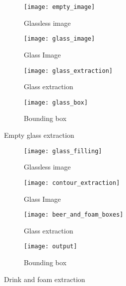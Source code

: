\documentclass[11pt]{article}
\begin{document}
    \begin{figure}
        \centering
        \begin{subfigure}[b]{0.2\textwidth}
            \centering
            \texttt{[image: empty\_image]}
            \caption{Glassless image}
        \end{subfigure}
        \begin{subfigure}[b]{0.2\textwidth}
            \centering
            \texttt{[image: glass\_image]}
            \caption{Glass Image}
        \end{subfigure}
        \begin{subfigure}[b]{0.2\textwidth}
            \centering
            \texttt{[image: glass\_extraction]}
            \caption{Glass extraction}
        \end{subfigure}
        \begin{subfigure}[b]{0.2\textwidth}
            \centering
            \texttt{[image: glass\_box]}
            \caption{Bounding box}
        \end{subfigure}
        \caption{Empty glass extraction}
        \label{fig:figure}
    \end{figure}

    \begin{figure}
        \centering
        \begin{subfigure}[b]{0.2\textwidth}
            \centering
            \texttt{[image: glass\_filling]}
            \caption{Glassless image}
        \end{subfigure}
        \begin{subfigure}[b]{0.2\textwidth}
            \centering
            \texttt{[image: contour\_extraction]}
            \caption{Glass Image}
        \end{subfigure}
        \begin{subfigure}[b]{0.2\textwidth}
            \centering
            \texttt{[image: beer\_and\_foam\_boxes]}
            \caption{Glass extraction}
        \end{subfigure}
        \begin{subfigure}[b]{0.2\textwidth}
            \centering
            \texttt{[image: output]}
            \caption{Bounding box}
        \end{subfigure}
        \caption{Drink and foam extraction}
        \label{fig:figure2}
    \end{figure}
\end{document}
